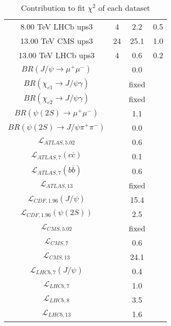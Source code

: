 \begin{table}[h!]
\begin{tabular}{c|c|c|c}
8.00 TeV LHCb ups3 & 4 & 2.2 & 0.5 \\
13.00 TeV CMS ups3 & 24 & 25.1 & 1.0 \\
13.00 TeV LHCb ups3 & 4 & 0.6 & 0.2 \\
\hline
$BR(J/\psi\rightarrow\mu^+\mu^-)$ &  & 0.0 &  \\
$BR(\chi_{c1}\rightarrow J/\psi\gamma)$ &  & fixed & \\
$BR(\chi_{c2}\rightarrow J/\psi\gamma)$ &  & fixed & \\
$BR(\psi(2S)\rightarrow\mu^+\mu^-)$ &  & 1.1 &  \\
$BR(\psi(2S)\rightarrow J/\psi\pi^+\pi^-)$ &  & 0.0 &  \\
$\mathcal L_{ATLAS,5.02}$ &  & 0.6 &  \\
$\mathcal L_{ATLAS,7}(c\overline c)$ &  & 0.1 &  \\
$\mathcal L_{ATLAS,7}(b\overline b)$ &  & 0.6 &  \\
$\mathcal L_{ATLAS,13}$ &  & fixed & \\
$\mathcal L_{CDF,1.96}(J/\psi)$ &  & 15.4 &  \\
$\mathcal L_{CDF,1.96}(\psi(2S))$ &  & 2.5 &  \\
$\mathcal L_{CMS,5.02}$ &  & fixed & \\
$\mathcal L_{CMS,7}$ &  & 0.6 &  \\
$\mathcal L_{CMS,13}$ &  & 24.1 &  \\
$\mathcal L_{LHCb,7}(J/\psi)$ &  & 0.4 &  \\
$\mathcal L_{LHCb,7}$ &  & 1.0 &  \\
$\mathcal L_{LHCb,8}$ &  & 3.5 &  \\
$\mathcal L_{LHCb,13}$ &  & 1.6 &  \\
\end{tabular}
\caption{Contribution to fit $\chi^2$ of each dataset}
\end{table}
